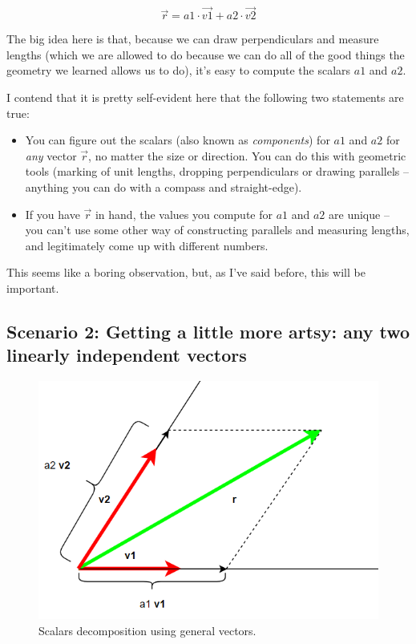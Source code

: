 \documentclass[
]{book}
\providecommand{\tightlist}{%
  \setlength{\itemsep}{0pt}\setlength{\parskip}{0pt}}
\begin{document}
\[\vec{r} = a1 \cdot \vec{v1} + a2 \cdot \vec{v2}\]

The big idea here is that, because we can draw perpendiculars and measure lengths (which we are allowed to do because we can do all of the good things the geometry we learned allows us to do), it's easy to compute the scalars \(a1\) and \(a2\).

I contend that it is pretty self-evident here that the following two statements are true:

\begin{itemize}
\tightlist
\item
  You can figure out the scalars (also known as \emph{components}) for \(a1\) and \(a2\) for \emph{any} vector \(\vec{r}\), no matter the size or direction. You can do this with geometric tools (marking of unit lengths, dropping perpendiculars or drawing parallels -- anything you can do with a compass and straight-edge).
\item
  If you have \(\vec{r}\) in hand, the values you compute for \(a1\) and \(a2\) are unique -- you can't use some other way of constructing parallels and measuring lengths, and legitimately come up with different numbers.
\end{itemize}

This seems like a boring observation, but, as I've said before, this will be important.

\hypertarget{scenario-2-getting-a-little-more-artsy-any-two-linearly-independent-vectors}{%
\subsection{Scenario 2: Getting a little more artsy: any two linearly independent vectors}\label{scenario-2-getting-a-little-more-artsy-any-two-linearly-independent-vectors}}

\begin{figure}

{\centering \includegraphics[width=0.75\linewidth,height=0.75\textheight]{images/parallelogram-decomposition} 

}

\caption{Scalars decomposition using general vectors.}\label{fig:unnamed-chunk-7}
\end{figure}
\end{document}
